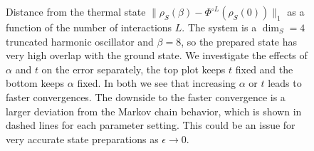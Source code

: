 \documentclass{article}
\newcommand{\norm}[1]{\| #1 \|}
\begin{document}
\begin{figure}
    \caption{Distance from the thermal state $ \norm{\rho_S(\beta) - \Phi^{\circ L}(\rho_S(0))}_1$ as a function of the number of interactions $L$. The system is a $\dim_S = 4$ truncated harmonic oscillator and $\beta = 8$, so the prepared state has very high overlap with the ground state. We investigate the effects of $\alpha$ and $t$ on the error separately, the top plot keeps $t$ fixed and the bottom keeps $\alpha$ fixed. In both we see that increasing $\alpha$ or $t$ leads to faster convergences. The downside to the faster convergence is a larger deviation from the Markov chain behavior, which is shown in dashed lines for each parameter setting. This could be an issue for very accurate state preparations as $\epsilon \to 0$.}
    \label{fig:sho_error_vs_interactions}
\end{figure}
\end{document}
